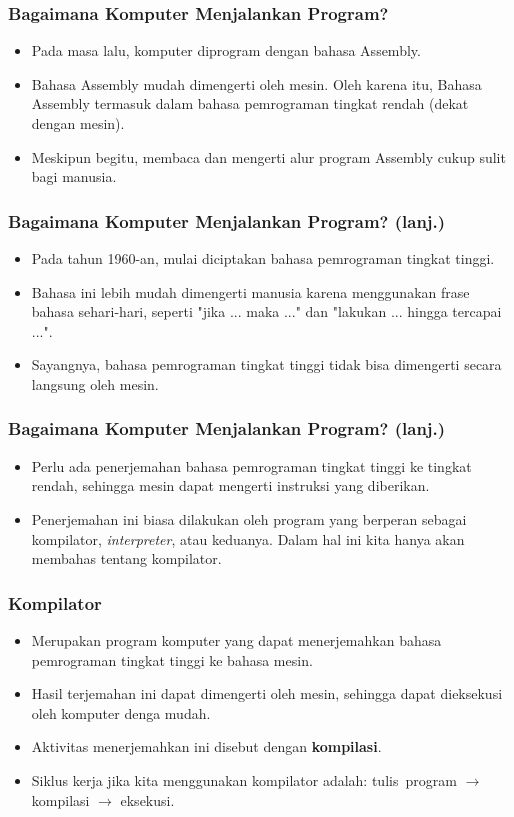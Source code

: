 \begin{frame}
\frametitle{Bagaimana Komputer Menjalankan Program?}
\begin{itemize}
  \item Pada masa lalu, komputer diprogram dengan bahasa Assembly.
  \item Bahasa Assembly mudah dimengerti oleh mesin. Oleh karena itu, Bahasa Assembly termasuk dalam bahasa pemrograman tingkat rendah (dekat dengan mesin).
  \item Meskipun begitu, membaca dan mengerti alur program Assembly cukup sulit bagi manusia.
\end{itemize}
\end{frame}

\begin{frame}
\frametitle{Bagaimana Komputer Menjalankan Program? (lanj.)}
\begin{itemize}
  \item Pada tahun 1960-an, mulai diciptakan bahasa pemrograman tingkat tinggi.
  \item Bahasa ini lebih mudah dimengerti manusia karena menggunakan frase bahasa sehari-hari, seperti "jika ... maka ..." dan "lakukan ... hingga tercapai ...".
  \item Sayangnya, bahasa pemrograman tingkat tinggi tidak bisa dimengerti secara langsung oleh mesin.
\end{itemize}
\end{frame}

\begin{frame}
\frametitle{Bagaimana Komputer Menjalankan Program? (lanj.)}
\begin{itemize}
  \item Perlu ada penerjemahan bahasa pemrograman tingkat tinggi ke tingkat rendah, sehingga mesin dapat mengerti instruksi yang diberikan.
  \item Penerjemahan ini biasa dilakukan oleh program yang berperan sebagai kompilator, \textit{interpreter}, atau keduanya. Dalam hal ini kita hanya akan membahas tentang kompilator.
\end{itemize}
\end{frame}

\begin{frame}
\frametitle{Kompilator}
\begin{itemize}
  \item Merupakan program komputer yang dapat menerjemahkan bahasa pemrograman tingkat tinggi ke bahasa mesin.
  \item Hasil terjemahan ini dapat dimengerti oleh mesin, sehingga dapat dieksekusi oleh komputer denga mudah.
  \item Aktivitas menerjemahkan ini disebut dengan \textbf{kompilasi}.
  \item Siklus kerja jika kita menggunakan kompilator adalah: tulis~program $\rightarrow$ kompilasi $\rightarrow$ eksekusi.
\end{itemize}
\end{frame}


